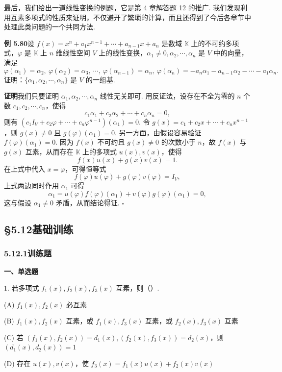 \documentclass[UTF8, 12pt, fontset=fandol, oneside]{ctexart}
\begin{document}
最后，我们给出一道线性变换的例题，它是第 4 章解答题 12 的推广. 我们发现利用互素多项式的性质来证明，不仅避开了繁琐的计算，而且还得到了今后各章节中处理此类问题的一个共同方法.

\noindent\textbf{例 5.80}\quad 设 $f(x)=x^n+a_1x^{n-1}+\cdots+a_{n-1}x+a_n$ 是数域 $\mathbb{K}$ 上的不可约多项式，$\varphi$ 是 $\mathbb{K}$ 上 $n$ 维线性空间 $V$ 上的线性变换，$\alpha_1\ne0,\alpha_2,\cdots,\alpha_n$ 是 $V$ 中的向量，满足
\[
\varphi(\alpha_1)=\alpha_2,\ \varphi(\alpha_2)=\alpha_3,\ \cdots,\ \varphi(\alpha_{n-1})=\alpha_n,\ \varphi(\alpha_n)=-a_n\alpha_1-a_{n-1}\alpha_2-\cdots-a_1\alpha_n.
\]
证明：$\{\alpha_1,\alpha_2,\cdots,\alpha_n\}$ 是 $V$ 的一组基.

\noindent\textbf{证明}\quad 我们只要证明 $\alpha_1,\alpha_2,\cdots,\alpha_n$ 线性无关即可. 用反证法，设存在不全为零的 $n$ 个数 $c_1,c_2,\cdots,c_n$，使得
\[
c_1\alpha_1+c_2\alpha_2+\cdots+c_n\alpha_n=0,
\]
则有 $(c_1I_V+c_2\varphi+\cdots+c_n\varphi^{n-1})(\alpha_1)=0$. 令 $g(x)=c_1+c_2x+\cdots+c_nx^{n-1}$，则 $g(x)\ne0$ 且 $g(\varphi)(\alpha_1)=0$. 另一方面，由假设容易验证 $f(\varphi)(\alpha_1)=0$. 因为 $f(x)$ 不可约且 $g(x)\ne0$ 的次数小于 $n$，故 $f(x)$ 与 $g(x)$ 互素，从而存在 $\mathbb{K}$ 上的多项式 $u(x),v(x)$，使得
\[
f(x)u(x)+g(x)v(x)=1.
\]
在上式中代入 $x=\varphi$，可得恒等式
\[
f(\varphi)u(\varphi)+g(\varphi)v(\varphi)=I_V,
\]
上式两边同时作用 $\alpha_1$ 可得
\[
\alpha_1=u(\varphi)f(\varphi)(\alpha_1)+v(\varphi)g(\varphi)(\alpha_1)=0,
\]
这与假设 $\alpha_1\ne0$ 矛盾，从而结论得证. \hfill $\square$

\subsection*{§5.12\quad 基础训练}

\subsubsection*{5.12.1\quad 训练题}

\noindent\textbf{一、单选题}

1. 若多项式 $f_1(x),f_2(x),f_3(x)$ 互素，则（\quad ）.

(A) $f_1(x),f_2(x)$ 必互素

(B) $f_1(x),f_2(x)$ 互素，或 $f_1(x),f_3(x)$ 互素，或 $f_2(x),f_3(x)$ 互素

(C) 若 $(f_1(x),f_2(x))=d_1(x),(f_2(x),f_3(x))=d_2(x)$，则 $(d_1(x),d_2(x))=1$

(D) 存在 $u(x),v(x)$，使 $f_3(x)=f_1(x)u(x)+f_2(x)v(x)$
\end{document}
